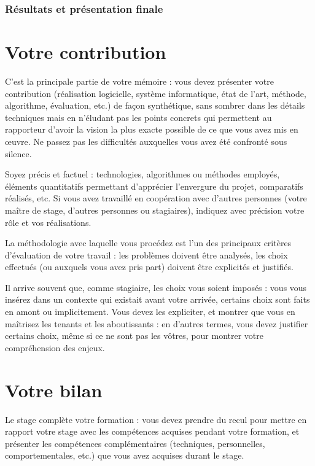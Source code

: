 \documentclass [twoside,openright,a4paper,11pt,french] {report}
\begin{document}
\subsubsection{Résultats et présentation finale}


\section {Votre contribution}

C'est la principale partie de votre mémoire : vous devez présenter votre
contribution (réalisation logicielle, système informatique, état de
l'art, méthode, algorithme, évaluation, etc.) de façon synthétique,
sans sombrer dans les détails techniques mais en n'éludant pas les
points concrets qui permettent au rapporteur d'avoir la vision la plus
exacte possible de ce que vous avez mis en œuvre. Ne passez pas
les difficultés auxquelles vous avez été confronté sous silence.

Soyez précis et factuel : technologies, algorithmes ou méthodes
employés, éléments quantitatifs permettant d'apprécier l'envergure
du projet, comparatifs réalisés, etc. Si vous avez travaillé en
coopération avec d'autres personnes (votre maître de stage, d'autres
personnes ou stagiaires), indiquez avec précision votre rôle et vos
réalisations.

La méthodologie avec laquelle vous procédez est l'un des principaux
critères d'évaluation de votre travail : les problèmes doivent
être analysés, les choix effectués (ou auxquels vous avez pris part)
doivent être explicités et justifiés.

Il arrive souvent que, comme stagiaire, les choix vous soient imposés :
vous vous insérez dans un contexte qui existait avant votre arrivée,
certains choix sont faits en amont ou implicitement. Vous devez
les expliciter, et montrer que vous en maîtrisez les tenants et les
aboutissants : en d'autres termes, vous devez justifier certains choix,
même si ce ne sont pas les vôtres, pour montrer votre compréhension
des enjeux.

\section {Votre bilan}

Le stage complète votre formation : vous devez prendre du recul pour
mettre en rapport votre stage avec les compétences acquises pendant votre
formation, et présenter les compétences complémentaires (techniques,
personnelles, comportementales, etc.) que vous avez acquises durant
le stage.
\end{document}
